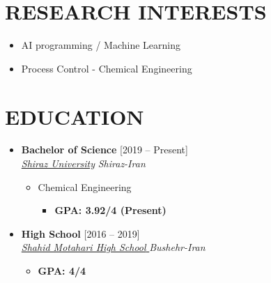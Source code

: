 \documentclass[10pt,a4paper,sans]{moderncv} %
\begin{document}
	
	\makecvtitle
	
	\section{RESEARCH INTERESTS}
	\begin{itemize}
		\item AI programming / Machine Learning
		\item Process Control - Chemical Engineering
		
	\end{itemize}
	
	\vspace{-0.9em}
	
	\section{EDUCATION}
	
	\begin{itemize}

		\item \textbf{Bachelor of Science} \hfill [2019 -- Present] \\
		\href{https://cpe.shirazu.ac.ir/}{ \emph{Shiraz University}} \hfill \emph{Shiraz-Iran}
		
		\begin{itemize}
			\item Chemical Engineering
			\begin{itemize}		
				 
				   
				\item\textbf{GPA: 3.92/4 (Present)}
			\end{itemize}
		\end{itemize}
		
		
		\vspace{0.71 em}
		
		\item \textbf{High School} \hfill [2016 -- 2019] \\
		\href{}{ \emph{Shahid Motahari High School }} \hfill \emph{Bushehr-Iran}
		
		\begin{itemize}
			\begin{itemize}		
				
				\item\textbf{GPA: 4/4}
			\end{itemize}
		\end{itemize}

		
	\end{itemize}
	
\end{document}
